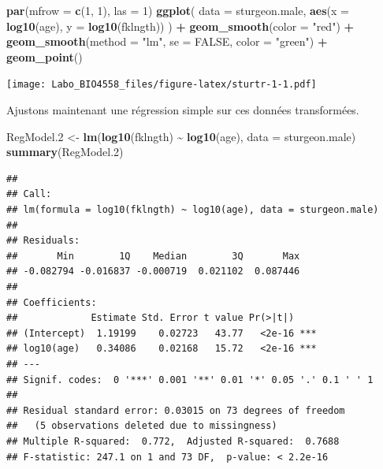\documentclass[
  12pt,
]{book}
\newenvironment{Shaded}{\begin{snugshade}}{\end{snugshade}}
\newcommand{\DataTypeTok}[1]{\textcolor[rgb]{0.13,0.29,0.53}{#1}}
\newcommand{\DecValTok}[1]{\textcolor[rgb]{0.00,0.00,0.81}{#1}}
\newcommand{\FloatTok}[1]{\textcolor[rgb]{0.00,0.00,0.81}{#1}}
\newcommand{\KeywordTok}[1]{\textcolor[rgb]{0.13,0.29,0.53}{\textbf{#1}}}
\newcommand{\NormalTok}[1]{#1}
\newcommand{\OperatorTok}[1]{\textcolor[rgb]{0.81,0.36,0.00}{\textbf{#1}}}
\newcommand{\OtherTok}[1]{\textcolor[rgb]{0.56,0.35,0.01}{#1}}
\newcommand{\StringTok}[1]{\textcolor[rgb]{0.31,0.60,0.02}{#1}}
\begin{document}
\begin{Shaded}
\begin{Highlighting}[]
\KeywordTok{par}\NormalTok{(}\DataTypeTok{mfrow =} \KeywordTok{c}\NormalTok{(}\DecValTok{1}\NormalTok{, }\DecValTok{1}\NormalTok{), }\DataTypeTok{las =} \DecValTok{1}\NormalTok{)}
\KeywordTok{ggplot}\NormalTok{(}
  \DataTypeTok{data =}\NormalTok{ sturgeon.male,}
  \KeywordTok{aes}\NormalTok{(}\DataTypeTok{x =} \KeywordTok{log10}\NormalTok{(age), }\DataTypeTok{y =} \KeywordTok{log10}\NormalTok{(fklngth))}
\NormalTok{) }\OperatorTok{+}
\StringTok{  }\KeywordTok{geom\_smooth}\NormalTok{(}\DataTypeTok{color =} \StringTok{"red"}\NormalTok{) }\OperatorTok{+}
\StringTok{  }\KeywordTok{geom\_smooth}\NormalTok{(}\DataTypeTok{method =} \StringTok{"lm"}\NormalTok{, }\DataTypeTok{se =} \OtherTok{FALSE}\NormalTok{, }\DataTypeTok{color =} \StringTok{"green"}\NormalTok{) }\OperatorTok{+}
\StringTok{  }\KeywordTok{geom\_point}\NormalTok{()}
\end{Highlighting}
\end{Shaded}

\texttt{[image: Labo\_BIO4558\_files/figure-latex/sturtr-1-1.pdf]}

Ajustons maintenant une régression simple sur ces données transformées.

\begin{Shaded}
\begin{Highlighting}[]
\NormalTok{RegModel}\FloatTok{.2}\NormalTok{ \textless{}{-}}\StringTok{ }\KeywordTok{lm}\NormalTok{(}\KeywordTok{log10}\NormalTok{(fklngth) }\OperatorTok{\textasciitilde{}}\StringTok{ }\KeywordTok{log10}\NormalTok{(age), }\DataTypeTok{data =}\NormalTok{ sturgeon.male)}
\KeywordTok{summary}\NormalTok{(RegModel}\FloatTok{.2}\NormalTok{)}
\end{Highlighting}
\end{Shaded}

\begin{verbatim}
## 
## Call:
## lm(formula = log10(fklngth) ~ log10(age), data = sturgeon.male)
## 
## Residuals:
##       Min        1Q    Median        3Q       Max 
## -0.082794 -0.016837 -0.000719  0.021102  0.087446 
## 
## Coefficients:
##             Estimate Std. Error t value Pr(>|t|)    
## (Intercept)  1.19199    0.02723   43.77   <2e-16 ***
## log10(age)   0.34086    0.02168   15.72   <2e-16 ***
## ---
## Signif. codes:  0 '***' 0.001 '**' 0.01 '*' 0.05 '.' 0.1 ' ' 1
## 
## Residual standard error: 0.03015 on 73 degrees of freedom
##   (5 observations deleted due to missingness)
## Multiple R-squared:  0.772,  Adjusted R-squared:  0.7688 
## F-statistic: 247.1 on 1 and 73 DF,  p-value: < 2.2e-16
\end{verbatim}
\end{document}
